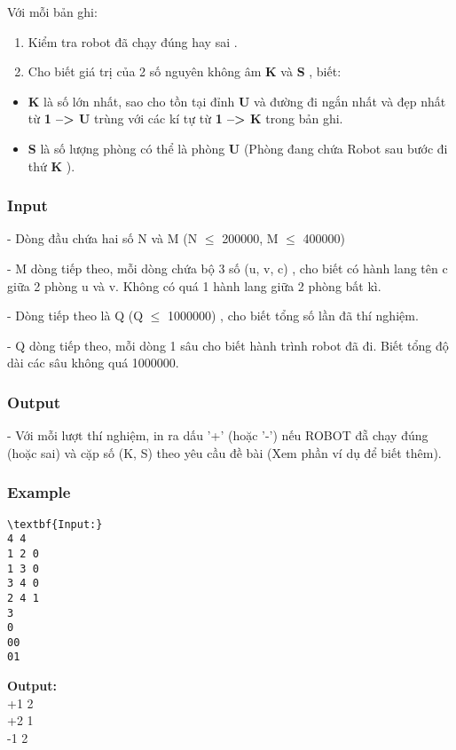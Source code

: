 Với mỗi bản ghi:
\begin{enumerate}
	\item Kiểm tra robot đã chạy đúng hay sai .
	\item Cho biết giá trị của 2 số nguyên không âm \textbf{ K } và \textbf{ S } , biết:
\end{enumerate}
\begin{enumerate}
\end{enumerate}
\begin{itemize}
	\item \textbf{K } là số lớn nhất, sao cho tồn tại đỉnh \textbf{ U } và đường đi ngắn nhất và đẹp nhất từ \textbf{ 1 --> U } trùng với các kí tự từ \textbf{ 1 --> K } trong bản ghi.
	\item \textbf{S } là số lượng phòng có thể là phòng \textbf{ U } (Phòng đang chứa Robot sau bước đi thứ \textbf{ K } ).
\end{itemize}

\subsubsection{Input}

- Dòng đầu chứa hai số N và M (N  $\le$  200000, M  $\le$  400000)

- M dòng tiếp theo, mỗi dòng chứa bộ 3 số (u, v, c) , cho biết có hành lang tên c giữa 2 phòng u và v. Không có quá 1 hành lang giữa 2 phòng bất kì.

- Dòng tiếp theo là Q (Q  $\le$  1000000) , cho biết tổng số lần đã thí nghiệm.

- Q dòng tiếp theo, mỗi dòng 1 sâu cho biết hành trình robot đã đi. Biết tổng độ dài các sâu không quá 1000000.

\subsubsection{Output}

- Với mỗi lượt thí nghiệm, in ra dấu '+' (hoặc '-') nếu ROBOT đẵ chạy đúng (hoặc sai) và cặp số (K, S) theo yêu cầu đề bài (Xem phần ví dụ để biết thêm).

\subsubsection{Example}
\begin{verbatim}
\textbf{Input:}
4 4
1 2 0
1 3 0
3 4 0
2 4 1
3
0
00
01\end{verbatim}

\textbf{Output:}
\\+1 2
\\+2 1
\\-1 2

